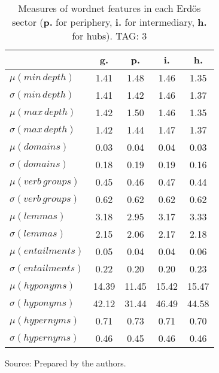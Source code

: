 \begin{table}[h!]
\begin{center}
\caption{Measures of wordnet features in each Erd\"os sector ({{\bf p.}} for periphery, {{\bf i.}} for intermediary, {{\bf h.}} for hubs). TAG: 3}
	\label{tab:wnv}
\begin{tabular}{| l || c | c | c | c |}\hline
 & {\bf g.} & {\bf p.} & {\bf i.} & {\bf h.} \\\hline\hline
$\mu(min\,depth)$ & 1.41  & 1.48  & 1.46  & 1.35 \\
$\sigma(min\,depth)$ & 1.41  & 1.42  & 1.46  & 1.37 \\\hline
$\mu(max\,depth)$ & 1.42  & 1.50  & 1.46  & 1.35 \\
$\sigma(max\,depth)$ & 1.42  & 1.44  & 1.47  & 1.37 \\\hline
$\mu(domains)$ & 0.03  & 0.04  & 0.04  & 0.03 \\
$\sigma(domains)$ & 0.18  & 0.19  & 0.19  & 0.16 \\\hline
$\mu(verb\,groups)$ & 0.45  & 0.46  & 0.47  & 0.44 \\
$\sigma(verb\,groups)$ & 0.62  & 0.62  & 0.62  & 0.62 \\\hline
$\mu(lemmas)$ & 3.18  & 2.95  & 3.17  & 3.33 \\
$\sigma(lemmas)$ & 2.15  & 2.06  & 2.17  & 2.18 \\\hline
$\mu(entailments)$ & 0.05  & 0.04  & 0.04  & 0.06 \\
$\sigma(entailments)$ & 0.22  & 0.20  & 0.20  & 0.23 \\\hline
$\mu(hyponyms)$ & 14.39  & 11.45  & 15.42  & 15.47 \\
$\sigma(hyponyms)$ & 42.12  & 31.44  & 46.49  & 44.58 \\\hline
$\mu(hypernyms)$ & 0.71  & 0.73  & 0.71  & 0.70 \\
$\sigma(hypernyms)$ & 0.46  & 0.45  & 0.46  & 0.46 \\\hline
\end{tabular}
\begin{flushleft}
		Source: Prepared by the authors.\
\end{flushleft}
\end{center}
\end{table}
